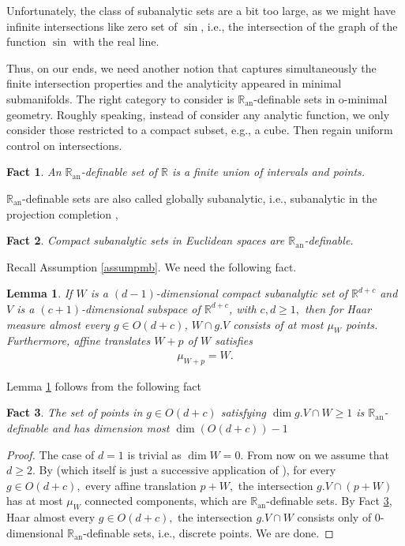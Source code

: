 \documentclass[11pt,a4paper]{amsart}
\numberwithin{equation}{section}
\newcommand{\ran}{\mathbb{R}_{\operatorname{an}}}
\newcommand{\R}{\mathbb{R}}
\theoremstyle{plain}
\newtheorem{lem}{Lemma}[subsection]
\newtheorem{fact}{Fact}[subsection]
\theoremstyle{definition}
\numberwithin{equation}{subsection}
\begin{document}
Unfortunately, the class of subanalytic sets are a bit too large, as we might have infinite intersections like zero set of $\sin$, i.e., the intersection of the graph of the function $\sin$ with the real line.
	
	Thus, on our ends, we need another notion that captures simultaneously the finite intersection properties and the analyticity appeared in minimal submanifolds. The right category to consider is $\ran$-definable sets in o-minimal geometry. Roughly speaking, instead of consider any analytic function, we only consider those restricted to a compact subset, e.g., a cube. Then regain uniform control on intersections.
	\begin{fact}\label{fctranl}\cite[Definition on p.506 and discussion right after it]{VDDMom}
		An $\ran$-definable set of $\R$ is a finite union of intervals and points.
	\end{fact}
$\ran$-definable sets are also called globally subanalytic, i.e., subanalytic in the projection completion \cite[2.5 Example (4)]{VDDMom},
	\begin{fact}\label{fctsubran}
		Compact subanalytic sets in Euclidean spaces are $\ran$-definable.
	\end{fact}
Recall Assumption \ref{assumpmb}. We need the following fact.\begin{lem}\label{fctsub}
	If $W$ is a $(d-1)$-dimensional compact subanalytic set of $\R^{d+c}$ and $V$ is a $(c+1)$-dimensional subspace of $\R^{d+c}$, with $c,d\ge 1,$ then for Haar measure almost every $g\in O(d+c)$, $W\cap g.V$ consists of at most $\mu_W$ points. Furthermore, affine translates $W+p$ of $W$ satisfies
	\begin{align*}
		\mu_{W+p}=W.
	\end{align*} 
\end{lem}	
Lemma \ref{fctsub} follows from the following fact
\begin{fact}\label{fctodc}
	The set of points in $g\in O(d+c)$ satisfying $\dim g.V\cap W\ge 1$ is $\ran$-definable and has dimension most $\dim(O(d+c))-1$
\end{fact}
\begin{proof}
The case of $d=1$ is trivial as $\dim W=0$. From now on we assume that $d\ge 2.$	By \cite[Exercise 3.13]{MComin} (which itself is just a successive application of \cite[Theorem 3.12]{MComin}), for every $g\in O(d+c),$ every affine translation $p+W,$ the intersection $g.V\cap (p+W)$ has at most $\mu_W$ connected components, which are $\ran$-definable sets. By Fact \ref{fctodc}, Haar almost every $g\in O(d+c),$ the intersection $g.V\cap W$ consists only of $0$-dimensional $\ran$-definable sets, i.e., discrete points. We are done.
\end{proof}
\end{document}
